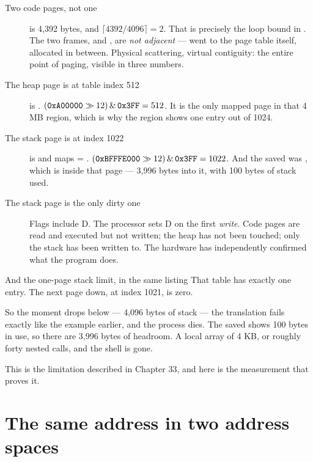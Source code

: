 \begin{description}
  \item[Two code pages, not one]  is 4,392 bytes, and
    $\lceil 4392 / 4096 \rceil = 2$. That is precisely the loop bound in . The
    two frames,  and , are \emph{not adjacent} ---  went to the
    page table itself, allocated in between. Physical scattering, virtual contiguity: the entire
    point of paging, visible in three numbers.
  \item[The heap page is at table index 512]  is .
    $(\texttt{0xA00000} \gg 12) \,\&\, \texttt{0x3FF} = 512$. It is the only mapped page in that 4 MB
    region, which is why the region shows one entry out of 1024.
  \item[The stack page is at index 1022]  is  and
     maps  = .
    $(\texttt{0xBFFFE000} \gg 12) \,\&\, \texttt{0x3FF} = 1022$. And the saved  was ,
    which is inside that page --- 3,996 bytes into it, with 100 bytes of stack used.
  \item[The stack page is the only dirty one] Flags  include D. The processor sets D on
    the first \emph{write}. Code pages are read and executed but not written; the heap has not been
    touched; only the stack has been written to. The hardware has independently confirmed what the
    program does.
\end{description}

\begin{danger}{And the one-page stack limit, in the same listing}
That table has exactly one entry. The next page down,  at index 1021, is zero.

So the moment  drops below  --- 4,096 bytes of stack --- the translation
fails exactly like the  example earlier, and the process dies. The saved 
shows 100 bytes in use, so there are 3,996 bytes of headroom. A local array of 4 KB, or roughly
forty nested calls, and the shell is gone.

This is the limitation described in Chapter 33, and here is the measurement that proves it.
\end{danger}

\section{The same address in two address spaces}

